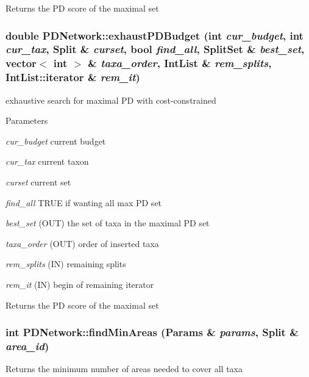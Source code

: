 \begin{DoxyReturn}{Returns}
the PD score of the maximal set 
\end{DoxyReturn}
\hypertarget{classPDNetwork_a05d495099dac5a851aa057c05bd5f780}{
\subsubsection[{exhaustPDBudget}]{\setlength{\rightskip}{0pt plus 5cm}double PDNetwork::exhaustPDBudget (int {\em cur\_\-budget}, \/  int {\em cur\_\-tax}, \/  {\bf Split} \& {\em curset}, \/  bool {\em find\_\-all}, \/  {\bf SplitSet} \& {\em best\_\-set}, \/  vector$<$ int $>$ \& {\em taxa\_\-order}, \/  IntList \& {\em rem\_\-splits}, \/  IntList::iterator \& {\em rem\_\-it})}}
\label{classPDNetwork_a05d495099dac5a851aa057c05bd5f780}
exhaustive search for maximal PD with cost-\/constrained 
\begin{DoxyParams}{Parameters}
\item[{\em cur\_\-budget}]current budget \item[{\em cur\_\-tax}]current taxon \item[{\em curset}]current set \item[{\em find\_\-all}]TRUE if wanting all max PD set \item[{\em best\_\-set}](OUT) the set of taxa in the maximal PD set \item[{\em taxa\_\-order}](OUT) order of inserted taxa \item[{\em rem\_\-splits}](IN) remaining splits \item[{\em rem\_\-it}](IN) begin of remaining iterator \end{DoxyParams}
\begin{DoxyReturn}{Returns}
the PD score of the maximal set 
\end{DoxyReturn}
\hypertarget{classPDNetwork_ad5c5c01afa0f14529d2b798670c8ce25}{
\subsubsection[{findMinAreas}]{\setlength{\rightskip}{0pt plus 5cm}int PDNetwork::findMinAreas ({\bf Params} \& {\em params}, \/  {\bf Split} \& {\em area\_\-id})}}
\label{classPDNetwork_ad5c5c01afa0f14529d2b798670c8ce25}
\begin{DoxyReturn}{Returns}
the minimum number of areas needed to cover all taxa 
\end{DoxyReturn}

